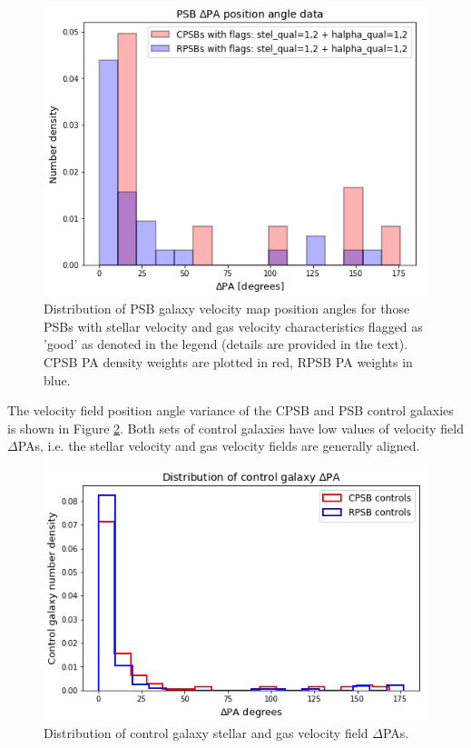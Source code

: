 \begin{figure}
    \centering
    \includegraphics[width=\columnwidth]{images/JupyterPlots/Dist-Delta-PA-All-GoodFlags.png}
    \caption[Distribution of PSB velocity field position angles]{Distribution of PSB galaxy velocity map position angles for those PSBs with stellar velocity and gas velocity characteristics flagged as 'good' as denoted in the legend (details are provided in the text). CPSB PA density weights are plotted in red, RPSB PA weights in blue.}
    \label{fig:deltaPAdistribution}
\end{figure}

The velocity field position angle variance of the CPSB and PSB control galaxies is shown in Figure \ref{fig:controlDeltaPAs}. Both sets of control galaxies have low values of velocity field $\Delta$PAs, i.e. the stellar velocity and gas velocity fields are generally aligned.

\begin{figure}
    \centering
    \includegraphics[width=\columnwidth]{images/JupyterPlots/Distribution-of-control-galaxy-deltaPA.png}
    \caption[Distribution of control galaxy $\Delta$PAs]{Distribution of control galaxy stellar and gas velocity field $\Delta$PAs.}
    \label{fig:controlDeltaPAs}
\end{figure}

